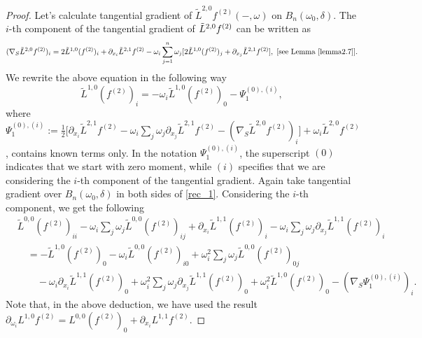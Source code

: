 \documentclass[11pt,a4paper,reqno]{amsart}
\newcommand{\om}{\omega}
\begin{document}
	\begin{proof}
		Let's calculate tangential gradient of $\tilde{L}^{2,0}f^{(2)}(-,\om)$ on $B_{n}(\omega_0,\delta)$. The $i$-th component of the tangential gradient of $\Tilde{L}^{2,0}f^{(2)}$ can be written as 
		\begin{equation*}
			(\nabla_{S}\tilde{L}^{2,0}f^{(2)})_{i}
			=2\tilde{L}^{1,0}(f^{(2)})_{i}+\partial_{x_i}\tilde{L}^{2,1}f^{(2)}-\omega_{i}\sum_{j=1}^{n}\omega_{j}[2\tilde{L}^{1,0}(f^{(2)})_{j}+\partial_{x_j}\tilde{L}^{2,1}f^{(2)}], \text{ [see Lemma \ref{lemma2.7}]}.
		\end{equation*}
	We rewrite the above equation in the following way
		\begin{equation}\label{rec_1}
			\tilde{L}^{1,0}(f^{(2)})_{i}=-\omega_{i}\tilde{L}^{1,0}(f^{(2)})_{0}-\Psi_{1}^{(0),(i)},
		\end{equation}
		where $\Psi_{1}^{(0),(i)}:=\frac{1}{2}\Big[\partial_{x_i}\tilde{L}^{2,1}f^{(2)}-\omega_{i}\sum_{j}\omega_{j}\partial_{x_j}\tilde{L}^{2,1}f^{(2)}-(\nabla_{S}\tilde{L}^{2,0}f^{(2)})_{i}\Big]+\omega_i \tilde{L}^{2,0}f^{(2)}$, contains known terms only. In the notation \( \Psi_{1}^{(0),(i)} \), the superscript \((0)\) indicates that we start with zero moment, while \((i)\) specifies that we are considering the $i$-th component of the tangential gradient.
		Again take tangential gradient over $B_{n}(\omega_0,\delta)$ in both sides of \eqref{rec_1}. Considering the $i$-th component, we get the following
		\begin{equation*}
			\begin{aligned}
				&\tilde{L}^{0,0}(f^{(2)})_{ii}
				- \omega_{i} \sum_{j} \omega_{j} \tilde{L}^{0,0}(f^{(2)})_{ij}
				+ \partial_{x_i} \tilde{L}^{1,1}(f^{(2)})_{i}
				- \omega_{i} \sum_{j} \omega_{j} \partial_{x_j} \tilde{L}^{1,1}(f^{(2)})_{i} \\
				&\quad =
				- \tilde{L}^{1,0}(f^{(2)})_{0}
				- \omega_{i} \tilde{L}^{0,0}(f^{(2)})_{i0}
				+ \omega_{i}^{2} \sum_{j} \omega_{j} \tilde{L}^{0,0}(f^{(2)})_{0j} \\
				&\qquad
				- \omega_{i} \partial_{x_i} \tilde{L}^{1,1}(f^{(2)})_{0}
				+ \omega_{i}^{2} \sum_{j} \omega_{j} \partial_{x_j} \tilde{L}^{1,1}(f^{(2)})_{0}
				+ \omega_{i}^{2} \tilde{L}^{1,0}(f^{(2)})_{0}
				- (\nabla_{S} \Psi_{1}^{(0),(i)})_{i}.
			\end{aligned}
		\end{equation*}
		Note that, in the above deduction, we have used the result $\partial_{\omega_{i}}L^{1,0}f^{(2)}=L^{0,0}(f^{(2)})_{0}+\partial_{x_i}L^{1,1}f^{(2)}$.

\end{proof}
\end{document}

